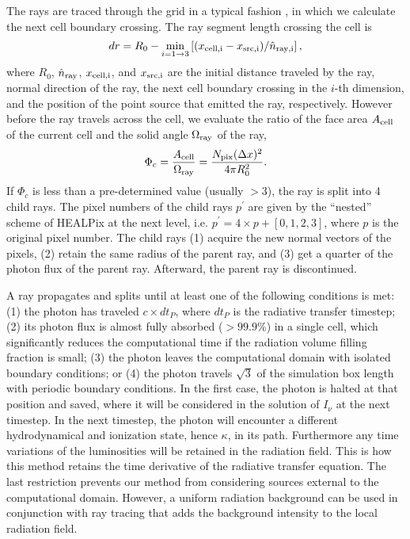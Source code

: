 The rays are traced through the grid in a typical fashion
\citep[e.g.][]{Abel99_RT}, in which we calculate the next cell
boundary crossing.  The ray segment length crossing the cell is
%
\begin{equation}
  \label{eqn:trace}
  dr = R_0 - \min_{i=1 \rightarrow 3} \left[(x_{\rm cell,i} - x_{\rm src,i}) /
    \hat{n}_{\rm ray,i} \right],
\end{equation}
%
where $R_0$, $\hat{n}_{\rm ray}$, $x_{\rm cell,i}$, and $x_{\rm
  src,i}$ are the initial distance traveled by the ray, normal
direction of the ray, the next cell boundary crossing in the $i$-th
dimension, and the position of the point source that emitted the ray,
respectively.  However before the ray travels across the cell, we
evaluate the ratio of the face area $A_{\rm cell}$ of the current cell
and the solid angle $\Omega_{\rm ray}$ of the ray,
%
\begin{equation}
  \label{eqn:split}
  \Phi_c = \frac{A_{\rm cell}} {\Omega_{\rm ray}} = 
  \frac{N_{\rm pix} (\Delta x)^2} {4\pi R_0^2}.
\end{equation}
%
If $\Phi_c$ is less than a pre-determined value (usually $>3$), the
ray is split into 4 child rays.  The pixel numbers of the child rays
$p^\prime$ are given by the ``nested'' scheme of HEALPix at the next
level, i.e. $p^\prime = 4 \times p + [0,1,2,3]$, where $p$ is the
original pixel number.  The child rays (1) acquire the new normal
vectors of the pixels, (2) retain the same radius of the parent ray,
and (3) get a quarter of the photon flux of the parent ray.
Afterward, the parent ray is discontinued.

A ray propagates and splits until at least one of the following
conditions is met: (1) the photon has traveled $c \times dt_P$, where
$dt_P$ is the radiative transfer timestep; (2) its photon flux is
almost fully absorbed ($>99.9\%$) in a single cell, which
significantly reduces the computational time if the radiation volume
filling fraction is small; (3) the photon leaves the computational
domain with isolated boundary conditions; or (4) the photon travels
$\sqrt{3}$ of the simulation box length with periodic boundary
conditions.  In the first case, the photon is halted at that position
and saved, where it will be considered in the solution of $I_\nu$ at
the next timestep.  In the next timestep, the photon will encounter a
different hydrodynamical and ionization state, hence $\kappa$, in its
path.  Furthermore any time variations of the luminosities will be
retained in the radiation field.  This is how this method retains the
time derivative of the radiative transfer equation.  The last
restriction prevents our method from considering sources external to
the computational domain. However, a uniform radiation background can
be used in conjunction with ray tracing that adds the background
intensity to the local radiation field.


